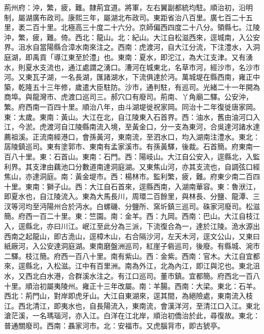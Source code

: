 \begin{pinyinscope}
荊州府：沖，繁，疲，難。隸荊宜道。將軍，左右翼副都統均駐。順治初，沿明制，屬湖廣布政司。康熙三年，屬湖北布政司。東距省治八百里。廣七百二十五里，袤二百十里。北極高三十度二十六分。京師偏西四度二十八分。領縣七。江陵沖，繁，疲，難。倚。西北：龍山。北：紀山。大江自松滋西來，逕城南，入公安界。沮水自當陽縣合漳水南來注之。西南：虎渡河，自大江分流，下注澧水，入洞庭湖，即禹貢「導江東至於澧」也。東南：夏水，即沱江，為大江支津。又有湧水，則夏水支流也，通江處謂之湧口。漕河在城東北，名草市河，經沙市，名沙市河。又東瓦子湖，一名長湖，匯諸湖水，下流俱達於沔。萬城堤在縣西南，雍正中築，乾隆五十三年修，歲遣大臣駐防。沙市，通判駐，有巡司。光緒二十一年開為商埠。與龍灣市、虎渡口巡司三。郝穴口有廢司。荊南、丫角廟二驛。公安沖，繁。府西南一百四十里。順治八年，由斗湖堤徙祝家岡。同治十二年復徙唐家岡。東：太歲。東南：黃山。大江在北，自江陵東入石首界。西：油水，舊由油河口入江，今淤。虎渡河自江陵縣南流入境，至黃金口，分一支為東河，合吳達河諸水達薦祖溪。正流南經港口，會孫黃河，東南流，至泗水口，均入湖南注澧水。東北：孱陵鎮巡司。東有塗郭市、東南有孟家溪市。有孫黃驛，後裁。石首簡。府東南一百八十里。東：石首山。東南：石門。西：陽岐山。大江自公安入，逕縣北，入監利界。其支津由藕池口分數道南達洞庭湖。又東焦山河，亦其支流也，自調弦口經焦山，亦達洞庭。南：黃金堤市。西：楊林市。監利繁，疲，難。府東少南二百四十里。東南：獅子山。西：大江自石首來，逕縣西南，入湖南華容。東：魯洑江，即夏水也，自江陵流入。東為大馬長川，周環二百餘里，與林長、分鹽、龍潭、三汊等河均至沔陽州合於沔水。白螺磯、分鹽所、窯圻鎮三巡司。硃家河廢司。松滋簡。府西一百二十里。東：竺園。南：金羊。西：九岡。西南：巴山。大江自枝江入，逕縣北，亦曰川江。岷江至此分為三派，下流復合為一，達於江陵。洈水源出西南之起龍山，即古洈山，逕樟木山，右合隔沙河，左天木河，逕文公山，又東曰紙廠河，入公安達洞庭湖。東南磨盤洲巡司，紅崖子砦巡司，後廢。有縣城、涴市二驛。枝江簡。府西一百八十里。南有紫山。西：金紫。西南：官木。大江自宜都來，逕縣北，入松滋。江中有百里洲。南為外江，北為內江，即江與沱也。東北沮水，又西北白水港，合群溪水注之。有江口巡司。董市鎮。宜都簡。府西北一百八十里。順治初屬夷陵州。雍正十三年改屬。南：羊腸。西南：大梁。東北：石羊。西北：荊門山，對岸即虎牙山。大江自東湖來，逕其間，為絕險處，東南流入枝江。西北清江，即夷水也，自長陽流入，東南流，會漢洋河，至清江口入江。東北滄茫溪，一名瑪瑙河，亦入江。白洋在江北岸，順治初僑治於此，尋復故。東北：普通關廢司。西南：聶家河市。北：安福市。又虎腦背市，即古猇亭。


\end{pinyinscope}
